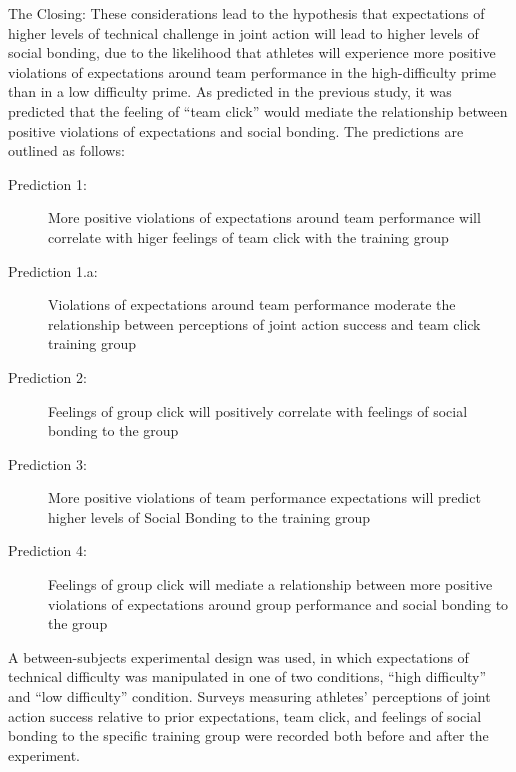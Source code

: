 


The Closing:
These considerations lead to the hypothesis that expectations of higher levels of technical challenge in joint action will lead to higher levels of social bonding, due to the likelihood that athletes will experience more positive violations of expectations around team performance in the high-difficulty prime than in a low difficulty prime.  As predicted in the previous study, it was predicted that the feeling of ``team click'' would mediate the relationship between positive violations of expectations and social bonding.  The predictions are outlined as follows:
\begin{description}
\item[Prediction 1:] More positive violations of expectations around team performance will correlate with higer feelings of team click with the training group
\item[Prediction 1.a:] Violations of expectations around team performance moderate the relationship between perceptions of joint action success and team click training group
\item[Prediction 2:] Feelings of group click will positively correlate with feelings of social bonding to the group
\item[Prediction 3:] More positive violations of team performance expectations will predict higher levels of Social Bonding to the training group
\item[Prediction 4:] Feelings of group click will mediate a relationship between more positive violations of expectations around group performance and social bonding to the group
\end{description}

A between-subjects experimental design was used, in which expectations of technical difficulty was manipulated in one of two conditions, ``high difficulty'' and ``low difficulty'' condition.  Surveys measuring athletes' perceptions of joint action success relative to prior expectations, team click, and feelings of social bonding to the specific training group were recorded both before and after the experiment.

